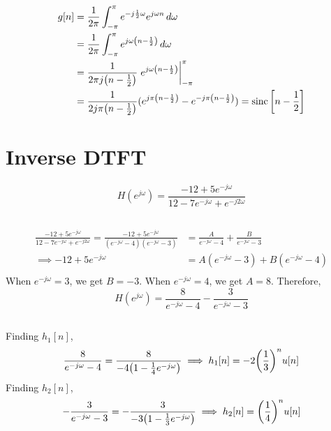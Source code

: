 \documentclass{article}
\begin{document}
\begin{align}
    g[n] &= \frac{1}{2\pi} \int_{-\pi}^\pi e^{-j \frac{1}{2} \omega} e^{j \omega n} \, d\omega \\
    &= \frac{1}{2\pi} \int_{-\pi}^\pi e^{j \omega \qty(n - \frac{1}{2})} \, d\omega \\
    &= \frac{1}{2\pi j \qty(n - \frac{1}{2})} \eval{e^{j \omega \qty(n - \frac{1}{2})}}_{-\pi}^\pi \\
    &= \frac{1}{2j \pi \qty(n - \frac{1}{2})} (e^{j \pi \qty(n - \frac{1}{2})} - e^{-j \pi \qty(n - \frac{1}{2})}) = \operatorname{sinc}\qty[n - \frac{1}{2}]
\end{align}

\section{Inverse DTFT}

\begin{equation}
    H(e^{j \omega}) = \frac{-12 + 5e^{-j \omega}}{12 - 7e^{-j \omega} + e^{-j 2\omega}}
\end{equation}

\subsection{}

\begin{align}
    \frac{-12 + 5e^{-j \omega}}{12 - 7e^{-j \omega} + e^{-j 2\omega}} = \frac{-12 + 5e^{-j \omega}}{(e^{-j \omega} - 4) (e^{-j \omega} - 3)} &= \frac{A}{e^{-j \omega} - 4} + \frac{B}{e^{-j \omega} - 3} \\
    \implies -12 + 5e^{-j \omega} &= A (e^{-j \omega} - 3) + B (e^{-j \omega} - 4) \\
\end{align}
When \(e^{-j \omega} = 3\), we get \(B = -3\).
When \(e^{-j \omega} = 4\), we get \(A = 8\).
Therefore,
\begin{equation}
    H(e^{j \omega}) = \frac{8}{e^{-j \omega} - 4} - \frac{3}{e^{-j \omega} - 3}
\end{equation}

\subsection{}

Finding \(h_1[n]\),
\begin{equation}
    \frac{8}{e^{-j \omega} - 4} = \frac{8}{-4 \qty(1 - \frac{1}{4} e^{-j \omega})} \implies h_1[n] = -2 \qty(\frac{1}{3})^n u[n]
\end{equation}
Finding \(h_2[n]\),
\begin{equation}
    -\frac{3}{e^{-j \omega} - 3} = -\frac{3}{-3 \qty(1 - \frac{1}{3} e^{-j \omega})} \implies h_2[n] = \qty(\frac{1}{4})^n u[n]
\end{equation}
\end{document}
